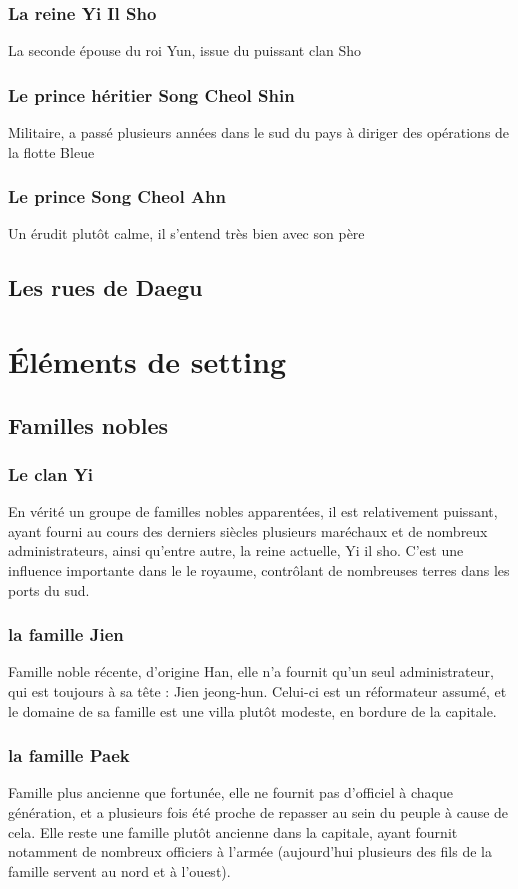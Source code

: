 \documentclass[10pt,a4paper]{book}
\begin{document}
\subsection{La reine Yi Il Sho}
La seconde épouse du roi Yun, issue du puissant clan Sho
\subsection{Le prince héritier Song Cheol Shin}
Militaire, a passé plusieurs années dans le sud du pays à diriger des opérations de la flotte Bleue
\subsection{Le prince Song Cheol Ahn}
Un érudit plutôt calme, il s'entend très bien avec son père
\section{Les rues de Daegu}
\chapter{Éléments de setting}
\section{Familles nobles}
\subsection{Le clan Yi}
En vérité un groupe de familles nobles apparentées, il est relativement puissant, ayant fourni au cours des derniers siècles plusieurs maréchaux et de nombreux administrateurs, ainsi qu'entre autre, la reine actuelle, Yi il sho. C'est une influence importante dans le le royaume, contrôlant de nombreuses terres dans les ports du sud.
\subsection{la famille Jien}
Famille noble récente, d'origine Han, elle n'a fournit qu'un seul administrateur, qui est toujours à sa tête : Jien jeong-hun. Celui-ci est un réformateur assumé, et le domaine de sa famille est une villa plutôt modeste, en bordure de la capitale.
\subsection{ la famille Paek}
Famille plus ancienne que fortunée, elle ne fournit pas d'officiel à chaque génération, et a plusieurs fois été proche de repasser au sein du peuple à cause de cela. Elle reste une famille plutôt ancienne dans la capitale, ayant fournit notamment de nombreux officiers à l'armée (aujourd'hui plusieurs des fils de la famille servent au nord et à l'ouest).
\end{document}
